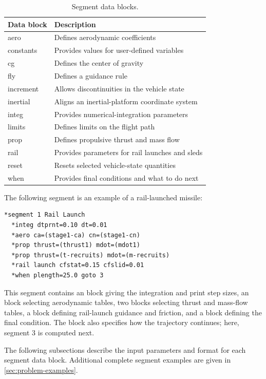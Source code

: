 \begin{table}[htbp]
  \centering
  \caption{Segment data blocks.}
  \label{tab:segment-data-blocks}
  \begin{tabularx}{0.88\linewidth}{@{}>{\ttfamily}lX@{}}
    \toprule
    \normalfont Data block & Description \\
    \midrule
    *aero      & Defines aerodynamic coefficients \\
    *constants & Provides values for user-defined variables \\
    *cg        & Defines the center of gravity \\
    *fly       & Defines a guidance rule \\
    *increment & Allows discontinuities in the vehicle state \\
    *inertial  & Aligns an inertial-platform coordinate system \\
    *integ     & Provides numerical-integration parameters \\
    *limits    & Defines limits on the flight path \\
    *prop      & Defines propulsive thrust and mass flow \\
    *rail      & Provides parameters for rail launches and sleds \\
    *reset     & Resets selected vehicle-state quantities \\
    *when      & Provides final conditions and what to do next \\
    \bottomrule
  \end{tabularx}
\end{table}

The following segment is an example of a rail-launched missile:

\begin{lstlisting}[style=taosmanual]
*segment 1 Rail Launch
  *integ dtprnt=0.10 dt=0.01
  *aero ca=(stage1-ca) cn=(stage1-cn)
  *prop thrust=(thrust1) mdot=(mdot1)
  *prop thrust=(t-recruits) mdot=(m-recruits)
  *rail launch cfstat=0.15 cfslid=0.01
  *when plength=25.0 goto 3
\end{lstlisting}

This segment contains an  block giving the integration and
print step sizes, an  block selecting aerodynamic tables, two
 blocks selecting thrust and mass-flow tables, a
 block defining rail-launch guidance and friction, and a
 block defining the final condition. The
 block also specifies how the trajectory continues; here,
segment 3 is computed next.

The following subsections describe the input parameters and format for each segment
data block. Additional complete segment examples are given in
\cref{sec:problem-examples}.
